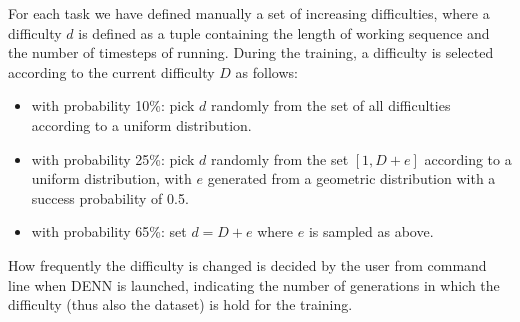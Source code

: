 For each task we have defined manually a set of increasing difficulties, where a difficulty $d$ is defined as a tuple containing the length of working sequence and the number of timesteps of running. During the training, a difficulty is selected according to the current difficulty $D$ as follows:
\begin{itemize}
	\item{with probability 10\%: pick $d$ randomly from the set of all difficulties according to a uniform distribution.}
	\item{with probability 25\%: pick $d$ randomly from the set $[1, D + e]$ according to a uniform distribution, with $e$ generated from a geometric distribution with a success probability of 0.5.}
	\item{with probability 65\%: set $d = D + e$ where $e$ is sampled as above.}
\end{itemize}
How frequently the difficulty is changed is decided by the user from command line when DENN is launched, indicating the number of generations in which the difficulty (thus also the dataset) is hold for the training.

